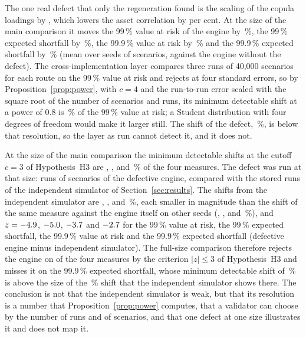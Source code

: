 The one real defect that only the regeneration found is the scaling of the copula loadings by \effLoadingFactor{}, which lowers the asset correlation by \effCorrPct{} per cent. At the size of the main comparison it moves the 99\,\% value at risk of the engine by \effChangeVarNinetyNine{}\,\%, the 99\,\% expected shortfall by \effChangeEsNinetyNine{}\,\%, the 99.9\,\% value at risk by \effChangeVarNinetyNineNine{}\,\% and the 99.9\,\% expected shortfall by \effChangeEsNinetyNineNine{}\,\% (mean over \effReps{} seeds of \effScen{} scenarios, against the engine without the defect). The cross-implementation layer compares three runs of 40,000 scenarios for each route on the 99\,\% value at risk and rejects at four standard errors, so by Proposition~\ref{prop:power}, with $c=4$ and the run-to-run error scaled with the square root of the number of scenarios and runs, its minimum detectable shift at a power of $0.8$ is \effMddVarNinetyNine{}\,\% of the 99\,\% value at risk; a Student distribution with four degrees of freedom would make it larger still. The shift of the defect, \effChangeVarNinetyNine{}\,\%, is below that resolution, so the layer as run cannot detect it, and it does not.

At the size of the main comparison the minimum detectable shifts at the cutoff $c=3$ of Hypothesis~H3 are \mcMddVarNinetyNine{}, \mcMddEsNinetyNine{}, \mcMddVarNinetyNineNine{} and \mcMddEsNinetyNineNine{}\,\% of the four measures. The defect was run at that size: \fsReps{} runs of \fsScen{} scenarios of the defective engine, compared with the stored runs of the independent simulator of Section~\ref{sec:results}. The shifts from the independent simulator are \fsShiftVarNinetyNine{}, \fsShiftEsNinetyNine{}, \fsShiftVarNinetyNineNine{} and \fsShiftEsNinetyNineNine{}\,\%, each smaller in magnitude than the shift of the same measure against the engine itself on other seeds (\effChangeVarNinetyNine{}, \effChangeEsNinetyNine{}, \effChangeVarNinetyNineNine{} and \effChangeEsNinetyNineNine{}\,\%), and $z=-4.9{}$, $-5.0{}$, $-3.7{}$ and $-2.7{}$ for the 99\,\% value at risk, the 99\,\% expected shortfall, the 99.9\,\% value at risk and the 99.9\,\% expected shortfall (defective engine minus independent simulator). The full-size comparison therefore rejects the engine on \fsFlagged{} of the four measures by the criterion $|z|\le3$ of Hypothesis~H3 and misses it on the 99.9\,\% expected shortfall, whose minimum detectable shift of \mcMddEsNinetyNineNine{}\,\% is above the size of the \fsShiftEsNinetyNineNine{}\,\% shift that the independent simulator shows there. The conclusion is not that the independent simulator is weak, but that its resolution is a number that Proposition~\ref{prop:power} computes, that a validator can choose by the number of runs and of scenarios, and that one defect at one size illustrates it and does not map it.
